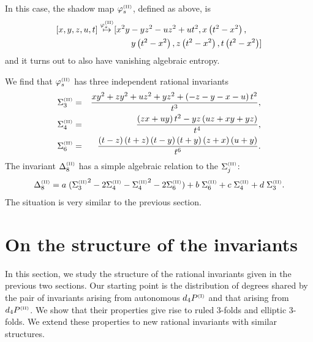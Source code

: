 \documentclass[reqno]{amsart}
\newcommand{\nn}{\nonumber}
\numberwithin{equation}{section}
\numberwithin{figure}{section}
\begin{document}
In this case, the shadow map $ \varphi^{\scriptscriptstyle (\rm II) }_s$, defined as above, is
\begin{eqnarray}\label{phid4pIIs}
  [x,y,z,u,t] \stackrel {  \varphi^{\scriptscriptstyle (\rm II) }_s}  { \mapsto}
 &[{x}^{2}y-y{z}^{2}-u{z}^{2}+u{t}^{2},  x \left( {t}^{2}-{x}^{2} \right) 
  ,\nn \\
  &\qquad y \left( {t}^{2}-{x}^{2} \right) , 
z \left( {t}^{2}-{x}^{2} \right) ,t
  \left( {t}^{2}-{x}^{2} \right) ]
\end{eqnarray}
and it turns out to also have vanishing algebraic entropy.

We find  that $ {  \varphi^{\scriptscriptstyle (\rm II) }_s}$ has three independent rational invariants
\begin{eqnarray*}
\Sigma^{\scriptscriptstyle (\rm II) }_3 & = &  {\frac {x{y}^{2}+z{y}^{2}+u{z}^{2}
+y{z}^{2}+ \left( -z-y-x-u \right) {t}^{2}}{{t}^{3}}}, \\
\Sigma^{\scriptscriptstyle (\rm II) }_4 & = & {\frac { \left( zx+uy \right) {t}^{2}
-yz \left( uz+xy+yz \right) }{{t}^{4}}},
\\
\Sigma^{\scriptscriptstyle  (\rm II)}_6 & = &{\frac { \left( t-z \right)  
\left( t+z \right)  \left( t-y \right) 
 \left( t+y \right)  \left( z+x \right)  \left( u+y \right) }{{t}^{6}}}.
\end{eqnarray*}
The invariant $\Delta^{\scriptscriptstyle (\rm II) }_8$ has a  simple algebraic relation to the $\Sigma^{\scriptscriptstyle (\rm II)}_j$: 
\begin{eqnarray*}
\Delta^{\scriptscriptstyle (\rm II) }_8 = a \;( {\Sigma^{\scriptscriptstyle (\rm II)}_3}^2 -2 {\Sigma}_4^{\scriptscriptstyle  (\rm II)} -  {\Sigma_4^{\scriptscriptstyle (\rm II)}}^2 - 2 \Sigma^{\scriptscriptstyle (\rm II) }_6) + b \; \Sigma^{\scriptscriptstyle (\rm II) }_6 + c\;  \Sigma^{\scriptscriptstyle (\rm II)}_4 + d\; \Sigma^{\scriptscriptstyle (\rm II) }_3 .
\end{eqnarray*}
The situation is very similar to the previous section.

\section{On the structure of the invariants}
\label{structure}
In this section, we study the structure of the rational invariants
given in the previous two sections. Our starting point is the
distribution of degrees shared by the pair of invariants arising from
autonomous $d_4P^{\scriptscriptstyle(\rm I)}$ and that arising from
$d_4P^{\scriptscriptstyle(\rm II)}$. We show that their properties
give rise to ruled 3-folds and elliptic 3-folds.  We extend these
properties to new rational invariants with similar structures.
\end{document}
